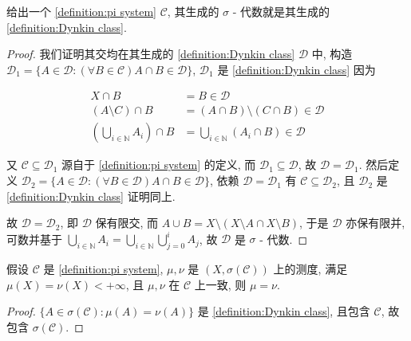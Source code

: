 \begin{lemma}
    给出一个 \ref{definition:pi system} \(\mathcal{C}\), 其生成的 \(\sigma\) - 代数就是其生成的 \ref{definition:Dynkin class}.

    \begin{proof}
        我们证明其交均在其生成的 \ref{definition:Dynkin class} \(\mathcal{D}\) 中, 构造 \(\mathcal{D}_1 = \{A \in \mathcal{D} : (\forall B \in \mathcal{C}) A \cap B \in \mathcal{D}\}\),
        \(\mathcal{D}_1\) 是 \ref{definition:Dynkin class} 因为

        \[
            \begin{aligned}
                X \cap B &= B \in \mathcal{D} \\
                (A \setminus C) \cap B &= (A \cap B) \setminus (C \cap B) \in \mathcal{D} \\
                (\bigcup_{i \in \mathbb{N}} A_i) \cap B &= \bigcup_{i \in \mathbb{N}} (A_i \cap B) \in \mathcal{D}
            \end{aligned}
        \]

        又 \(\mathcal{C} \subseteq \mathcal{D}_1\) 源自于 \ref{definition:pi system} 的定义, 而 \(\mathcal{D}_1 \subseteq \mathcal{D}\), 故 \(\mathcal{D} = \mathcal{D}_1\).
        然后定义 \(\mathcal{D}_2 = \{A \in \mathcal{D} : (\forall B \in \mathcal{D}) A \cap B \in \mathcal{D}\}\), 依赖 \(\mathcal{D} = \mathcal{D}_1\) 有 \(\mathcal{C} \subseteq \mathcal{D}_2\), 
        且 \(\mathcal{D}_2\) 是 \ref{definition:Dynkin class} 证明同上.

        故 \(\mathcal{D} = \mathcal{D}_2\), 即 \(\mathcal{D}\) 保有限交, 而 \(A \cup B = X \setminus (X \setminus A \cap X \setminus B)\), 于是 \(\mathcal{D}\) 亦保有限并,
        可数并基于 \(\bigcup_{i \in \mathbb{N}} A_i = \bigcup_{i \in \mathbb{N}} \bigcup_{j=0}^{i} A_j\), 故 \(\mathcal{D}\) 是 \(\sigma\) - 代数.
    \end{proof}
\end{lemma}

\begin{corollary}
    假设 \(\mathcal{C}\) 是 \ref{definition:pi system}, \(\mu,\nu\) 是 \((X,\sigma(\mathcal{C}))\) 上的测度,
    满足 \(\mu(X) = \nu(X) < +\infty\), 且 \(\mu,\nu\) 在 \(\mathcal{C}\) 上一致, 则 \(\mu = \nu\).

    \begin{proof}
        \(\{A \in \sigma(\mathcal{C}) : \mu(A) = \nu(A)\}\) 是 \ref{definition:Dynkin class}, 且包含 \(\mathcal{C}\), 故包含 \(\sigma(\mathcal{C})\).
    \end{proof}
\end{corollary}

